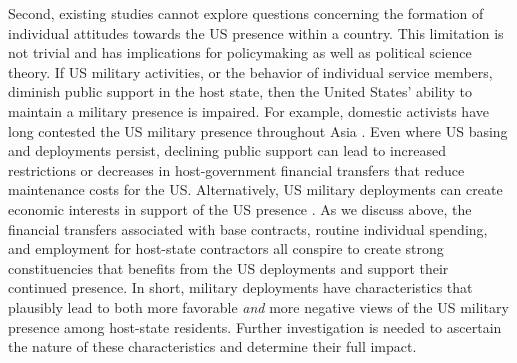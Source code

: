 Second, existing studies cannot explore questions concerning the formation of individual attitudes towards the US presence within a country. This limitation is not trivial and has implications for policymaking as well as political science theory. If US military activities, or the behavior of individual service members, diminish public support in the host state, then the United States' ability to maintain a military presence is impaired. For example, domestic activists have long contested the US military presence throughout Asia \cite{Chanlett-Avery2012}. Even where US basing and deployments persist, declining public support can lead to increased restrictions or decreases in host-government financial transfers that reduce maintenance costs for the US. Alternatively, US military deployments can create economic interests in support of the US presence \cite{Holmes2014}. As we discuss above, the financial transfers associated with base contracts, routine individual spending, and employment for host-state contractors all conspire to create strong constituencies that benefits from the US deployments and support their continued presence. In short, military deployments have characteristics that plausibly lead to both more favorable \textit{and} more negative views of the US military presence among host-state residents. Further investigation is needed to ascertain the nature of these characteristics and determine their full impact.

